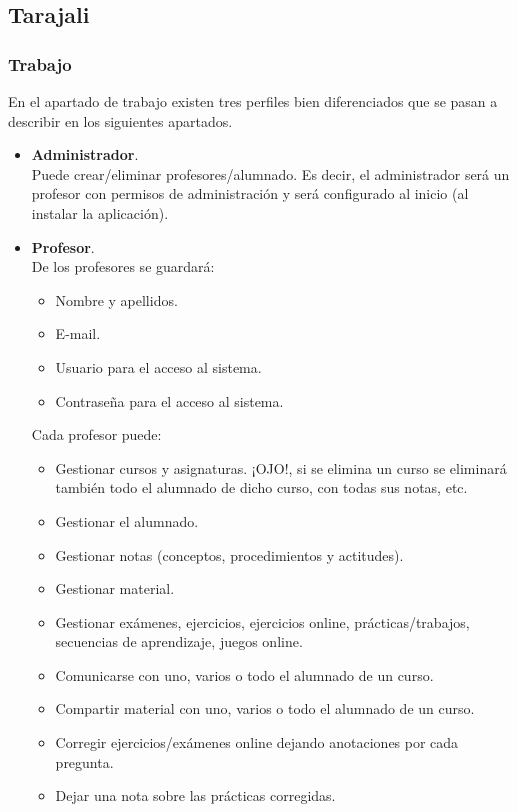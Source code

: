 \documentclass[12pt,twoside,a4paper]{article}
\begin{document}
\subsection{Tarajali}
\subsubsection{Trabajo}
En el apartado de trabajo existen tres perfiles bien diferenciados que se pasan a describir en los siguientes apartados.

\begin{itemize}
\item \textbf{Administrador}.\\
Puede crear/eliminar profesores/alumnado. Es decir, el administrador será un profesor con permisos de administración y será configurado al inicio (al instalar la aplicación).

\item \textbf{Profesor}.\\
De los profesores se guardará:
\begin{itemize}
\item Nombre y apellidos.
\item E-mail.
\item Usuario para el acceso al sistema.
\item Contraseña para el acceso al sistema.
\end{itemize}
Cada profesor puede:
\begin{itemize}
\item Gestionar cursos y asignaturas. ¡OJO!, si se elimina un curso se eliminará también todo el alumnado de dicho curso, con todas sus notas, etc.
\item Gestionar el alumnado.
\item Gestionar notas (conceptos, procedimientos y actitudes).
\item Gestionar material.
\item Gestionar exámenes, ejercicios, ejercicios online, prácticas/trabajos, secuencias de aprendizaje, juegos online.
\item Comunicarse con uno, varios o todo el alumnado de un curso.
\item Compartir material con uno, varios o todo el alumnado de un curso.
\item Corregir ejercicios/exámenes online dejando anotaciones por cada pregunta.
\item Dejar una nota sobre las prácticas corregidas.
\end{itemize}


\end{itemize}
\end{document}

